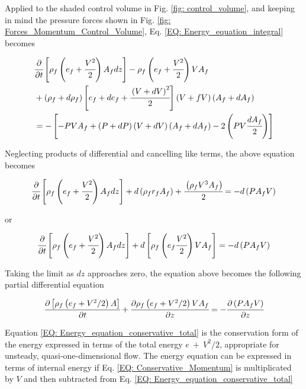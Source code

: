 \documentclass[../Article_Model_Parameters.tex]{subfiles}
\begin{document}
	Applied to the shaded control volume in Fig. \ref{fig: control_volume}, and keeping in mind the pressure forces shown in Fig. \ref{fig: Forces_Momentum_Control_Volume}, Eq. \ref{EQ: Energy_equation_integral} becomes
	
	{\footnotesize
		\begin{align}
			&\cfrac{\partial}{\partial t} \left[ \rho_f \left( e_f + \cfrac{V^2}{2} \right) A_f dz \right] - \rho_f \left( e_f + \cfrac{V^2}{2} \right) V A_f \nonumber \\
			&+ \left( \rho_f + d\rho_f \right) \left[ e_f + de_f + \cfrac{\left( V + dV \right)^2}{2} \right] \left( V+fV \right) \left( A_f+dA_f \right) \nonumber \\
			&= - \left[ -PVA_f + \left(P+dP\right) \left(V+dV\right) \left(A_f+dA_f\right) - 2\left( PV\cfrac{dA_f}{2} \right) \right]
		\end{align}
	}
	
	Neglecting products of differential and cancelling like terms, the above equation becomes
	
	{\footnotesize
		\begin{equation}
			\cfrac{\partial}{\partial t} \left[ \rho_f \left( e_f + \cfrac{V^2}{2} \right) A_f dz \right] + d\left( \rho_f r_f A_f \right) + \cfrac{ \left( \rho_f V^3 A_f \right) }{2} = -d \left( P A_f V \right)
		\end{equation}
	}

	or
	
	{\footnotesize
		\begin{equation}
			\cfrac{\partial}{\partial t} \left[ \rho_f \left( e_f + \cfrac{V^2}{2} \right) A_f dz \right] + d \left[ \rho_f \left( e_f \cfrac{V^2}{2} \right) VA_f \right] = - d\left( P A_f V \right)
		\end{equation}
	}

	Taking the limit as $dz$ approaches zero, the equation above becomes the following partial differential equation
	
	{\footnotesize
		\begin{equation}
			\cfrac{\partial \left[ \rho_f \left( e_f + V^2 / 2 \right) A \right]}{\partial t} + \cfrac{\partial \rho_f \left( e_f + V^2 / 2 \right)VA_f}{\partial z} = -\cfrac{\partial \left( P A_f V \right)}{\partial z}
			\label{EQ: Energy_equation_conservative_total}
		\end{equation}
	}
	
	Equation \ref{EQ: Energy_equation_conservative_total} is the conservation form of the energy expressed in terms of the total energy $e~+~V^2/2$, appropriate for unsteady, quasi-one-dimensional flow. The energy equation can be expressed in terms of internal energy if Eq. \ref{EQ: Conservative_Momentum} is multiplicated by $V$ and then subtracted from Eq. \ref{EQ: Energy_equation_conservative_total}
	
\end{document}
